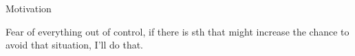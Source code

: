 
Motivation

Fear of everything out of control, if there is sth that might increase the chance to avoid that situation, I'll do that.

